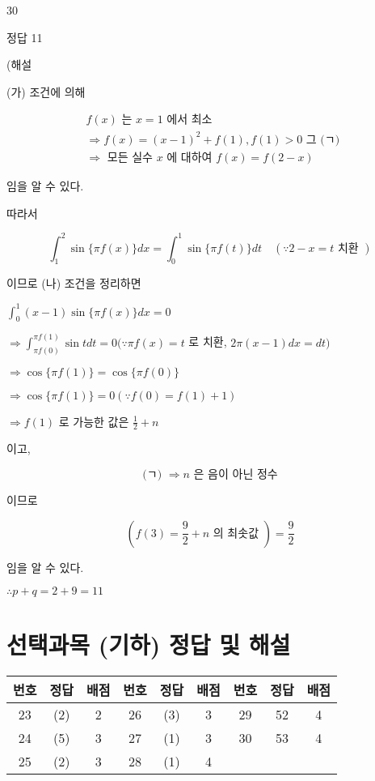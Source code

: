 \documentclass[10pt]{article}
\begin{document}
30

정답 11

(해설

(가) 조건에 의해

\[
\begin{aligned}
& f(x) \text { 는 } x=1 \text { 에서 최소 } \\
& \Rightarrow f(x)=(x-1)^{2}+f(1), f(1)>0 \text { 그 (ㄱ) } \\
& \Rightarrow \text { 모든 실수 } x \text { 에 대하여 } f(x)=f(2-x)
\end{aligned}
\]

임을 알 수 있다.

따라서

\[
\int_{1}^{2} \sin \{\pi f(x)\} d x=\int_{0}^{1} \sin \{\pi f(t)\} d t \quad(\because 2-x=t \text { 치환 })
\]

이므로 (나) 조건을 정리하면

\(\int_{0}^{1}(x-1) \sin \{\pi f(x)\} d x=0\)

\(\Rightarrow \int_{\pi f(0)}^{\pi f(1)} \sin t d t=0(\because \pi f(x)=t\) 로 치환, \(2 \pi(x-1) d x=d t)\)

\(\Rightarrow \cos \{\pi f(1)\}=\cos \{\pi f(0)\}\)

\(\Rightarrow \cos \{\pi f(1)\}=0(\because f(0)=f(1)+1)\)

\(\Rightarrow f(1)\) 로 가능한 값은 \(\frac{1}{2}+n\)

이고,

\[
\text { (ㄱ) } \Rightarrow n \text { 은 음이 아닌 정수 }
\]

이므로

\[
\left(f(3)=\frac{9}{2}+n \text { 의 최솟값 }\right)=\frac{9}{2}
\]

임을 알 수 있다.

\(\therefore p+q=2+9=11\)

\section*{선택과목 (기하) 정답 및 해설}
\begin{center}
\begin{tabular}{|c|c|c|c|c|c|c|c|c|}
\hline
번호 & 정답 & 배점 & 번호 & 정답 & 배점 & 번호 & 정답 & 배점 \\
\hline
23 & (2) & 2 & 26 & (3) & 3 & 29 & 52 & 4 \\
\hline
24 & (5) & 3 & 27 & (1) & 3 & 30 & 53 & 4 \\
\hline
25 & (2) & 3 & 28 & (1) & 4 &  &  &  \\
\hline
\end{tabular}
\end{center}
\end{document}
